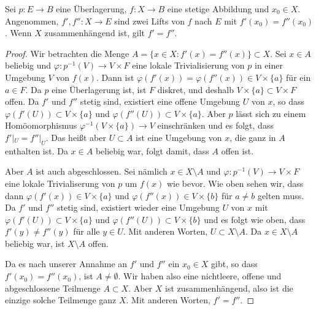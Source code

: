 \begin{theorem}\label{thm:lift-uniqueness}
Sei $p\colon E\to B$ eine Überlagerung, $f\colon X\to B$ eine stetige Abbildung und $x_0\in X$. Angenommen, $f',f''\colon X\to E$ sind zwei Lifts von $f$ nach $E$ mit $f'(x_0) = f''(x_0)$. Wenn $X$ zusammenhängend ist, gilt $f' = f''$.
\end{theorem}
\begin{proof}
Wir betrachten die Menge $A = \{x\in X : f'(x) = f''(x)\}\subset X$. Sei $x\in A$ beliebig und $\varphi\colon p^{-1}(V)\to V\times F$ eine lokale Trivialisierung von $p$ in einer Umgebung $V$ von $f(x)$. Dann ist $\varphi(f'(x)) = \varphi(f''(x))\in V\times\{a\}$ für ein $a\in F$. Da $p$ eine Überlagerung ist, ist $F$ diskret, und deshalb $V\times\{a\}\subset V\times F$ offen. Da $f'$ und $f''$ stetig sind, existiert eine offene Umgebung $U$ von $x$, so dass $\varphi(f'(U))\subset V\times\{a\}$ und $\varphi(f''(U))\subset V\times\{a\}$. Aber $p$ lässt sich zu einem Homöomorphismus $\varphi^{-1}(V\times\{a\}) \to V$ einschränken und es folgt, dass $f'|_U = f''|_U$. Das heißt aber $U\subset A$ ist eine Umgebung von $x$, die ganz in $A$ enthalten ist. Da $x\in A$ beliebig war, folgt damit, dass $A$ offen ist.

Aber $A$ ist auch abgeschlossen. Sei nämlich $x\in X\setminus A$ und $\varphi\colon p^{-1}(V)\to V\times F$ eine lokale Trivialiserung von $p$ um $f(x)$ wie bevor. Wie oben sehen wir, dass dann $\varphi(f'(x))\in V\times\{a\}$ und $\varphi(f''(x))\in V\times\{b\}$ für $a\neq b$ gelten muss. Da $f'$ und $f''$ stetig sind, existiert wieder eine Umgebung $U$ von $x$ mit $\varphi(f'(U))\subset V\times\{a\}$ und $\varphi(f''(U))\subset V\times\{b\}$ und es folgt wie oben, dass $f'(y)\neq f''(y)$ für alle $y\in U$. Mit anderen Worten, $U\subset X\setminus A$. Da $x\in X\setminus A$ beliebig war, ist $X\setminus A$ offen.

Da es nach unserer Annahme an $f'$ und $f''$ ein $x_0\in X$ gibt, so dass $f'(x_0) = f''(x_0)$, ist $A\neq \emptyset$. Wir haben also eine nichtleere, offene und abgeschlossene Teilmenge $A\subset X$. Aber $X$ ist zusammenhängend, also ist die einzige solche Teilmenge ganz $X$. Mit anderen Worten, $f' = f''$.
\end{proof}

